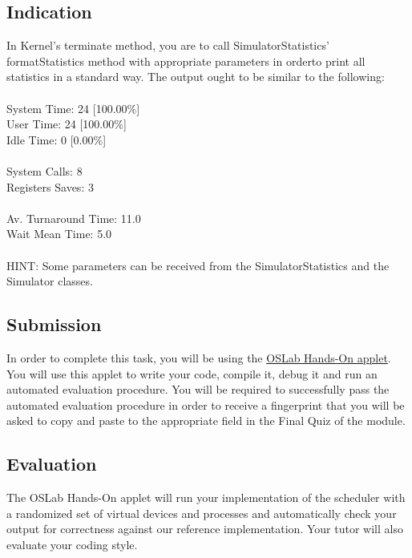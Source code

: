 \documentclass[11pt,a4paper]{scrreprt}
\begin{document}
\subsection{Indication}
In Kernel's terminate method, you are to call SimulatorStatistics' formatStatistics method with appropriate parameters in orderto print all statistics in a standard way. The output ought to be similar to the following:\\\\
System Time: 24 [100.00\%]\\
User Time: 24 [100.00\%]\\
Idle Time: 0 [0.00\%]\\\\
System Calls: 8\\
Registers Saves: 3\\\\
Av. Turnaround Time: 11.0\\
Wait Mean Time: 5.0\\\\
HINT: Some parameters can be received from the SimulatorStatistics and the Simulator classes.

\subsection{Submission}
In order to complete this task, you will be using the \href{https://oslab.unine.ch/portal/modules/2/oslab.jsp}{OSLab Hands-On applet}. You will use this applet to write your code, compile it, debug it and run an automated evaluation procedure. You will be required to successfully pass the automated evaluation procedure in order to receive a fingerprint that you will be asked to copy and paste to the appropriate field in the Final Quiz of the module.

\subsection{Evaluation}
The OSLab Hands-On applet will run your implementation of the scheduler with a randomized set of virtual devices and processes and automatically check your output for correctness against our reference implementation. Your tutor will also evaluate your coding style.
\end{document}
